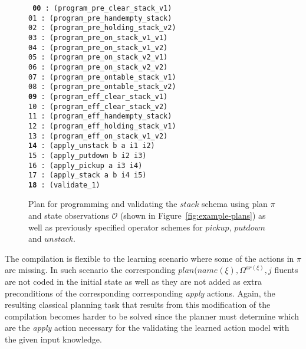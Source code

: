 \documentclass[3p,times]{elsarticle}
\begin{document}
\begin{figure}[hbt!]
{\footnotesize\tt
     {\bf 00} : (program\_pre\_clear\_stack\_v1)\\
     01 : (program\_pre\_handempty\_stack)\\
     02 : (program\_pre\_holding\_stack\_v2)\\
     03 : (program\_pre\_on\_stack\_v1\_v1)\\
     04 : (program\_pre\_on\_stack\_v1\_v2)\\
     05 : (program\_pre\_on\_stack\_v2\_v1)\\
     06 : (program\_pre\_on\_stack\_v2\_v2)\\
     07 : (program\_pre\_ontable\_stack\_v1)\\
     08 : (program\_pre\_ontable\_stack\_v2)\\
     {\bf 09} : (program\_eff\_clear\_stack\_v1)\\
    10 : (program\_eff\_clear\_stack\_v2)\\
    11 : (program\_eff\_handempty\_stack)\\
    12 : (program\_eff\_holding\_stack\_v1)\\
    13 : (program\_eff\_on\_stack\_v1\_v2)\\
    {\bf 14} : (apply\_unstack b a i1 i2)\\
    15 : (apply\_putdown b i2 i3)\\
    16 : (apply\_pickup a i3 i4)\\
    17 : (apply\_stack a b i4 i5)\\
    {\bf 18} : (validate\_1)
}
 \caption{\small Plan for programming and validating the $stack$ schema using plan $\pi$ and state observations $\mathcal{O}$ (shown in Figure~\ref{fig:example-plans}) as well as previously specified operator schemes for $pickup$, $putdown$ and $unstack$.}
\label{fig:plan-lplan}
\end{figure}

The compilation is flexible to the learning scenario where some of the actions in $\pi$ are missing. In such scenario the corresponding $plan(name(\xi),\Omega^{ar(\xi)},j$ fluents are not coded in the initial state as well as they are not added as extra preconditions of the corresponding corresponding {\em apply} actions. Again, the resulting classical planning task that results from this modification of the compilation becomes harder to be solved since the planner must determine which are the {\em apply} action necessary for the validating the learned action model with the given input knowledge.
\end{document}
